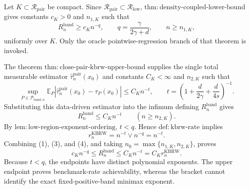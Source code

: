 Let \(K\subset\mathcal R_{\mathrm{pair}}\) be compact.  Since
\(\mathcal R_{\mathrm{pair}}\subset\mathcal R_{\mathrm{low}}\),
\(\mathrm{thm:density\mbox{-}coupled\mbox{-}lower\mbox{-}bound}\) gives constants
\(c_K>0\) and \(n_{1,K}\) such that
\[
R_n^{\mathrm{band}}\geq c_Kn^{-q},
\qquad q=\frac{\gamma}{2\gamma+d},
\qquad n\geq n_{1,K},
\tag{1}
\]
uniformly over \(K\).  Only the oracle pointwise-regression branch of that
theorem is invoked.

The theorem \(\mathrm{thm:close\mbox{-}pair\mbox{-}kbrw\mbox{-}upper\mbox{-}bound}\)
supplies the single total measurable estimator
\(\widehat\tau_n^{\mathrm{pair}}(x_0)\) and constants \(C_K<\infty\) and
\(n_{2,K}\) such that
\[
\sup_{P\in\mathcal P_{\mathrm{band},n}}
\mathbb E_P\left|
\widehat\tau_n^{\mathrm{pair}}(x_0)-\tau_P(x_0)
\right|
\leq C_Kn^{-t},
\qquad
t=\left(1+\frac d{2\gamma}+\frac d{4s}\right)^{-1}.
\tag{2}
\]
Substituting this data-driven estimator into the infimum defining
\(R_n^{\mathrm{band}}\) gives
\[
R_n^{\mathrm{band}}\leq C_Kn^{-t}
\qquad(n\geq n_{2,K}).
\tag{3}
\]
By \(\mathrm{lem:low\mbox{-}region\mbox{-}exponent\mbox{-}ordering}\),
\(t<q\).  Hence \(\mathrm{def:kbrw\mbox{-}rate}\) implies
\[
r_n^{\mathrm{KBRW}}=n^{-t}\vee n^{-q}=n^{-t}.
\tag{4}
\]
Combining (1), (3), and (4), and taking
\(n_0=\max\{n_{1,K},n_{2,K}\}\), proves
\[
c_Kn^{-q}\leq R_n^{\mathrm{band}}
\leq C_Kn^{-t}=C_Kr_n^{\mathrm{KBRW}}.
\]
Because \(t<q\), the endpoints have distinct polynomial exponents.  The upper
endpoint proves benchmark-rate achievability, whereas the bracket cannot identify
the exact fixed-positive-band minimax exponent.